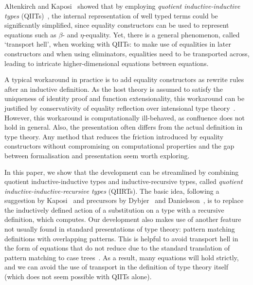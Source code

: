 \documentclass[a4paper,UKenglish,numberwithinsect,cleveref,thm-restate]{lipics-v2021}
\begin{document}
Altenkirch and Kaposi~\cite{Altenkirch2016a} showed that by employing \emph{quotient inductive-inductive types} (QIITs)~\cite{Altenkirch2018}, the internal representation of well typed terms could be significantly simplified, since equality constructors can be used to represent equations such as $\beta$- and $\eta$-equality.
%
Yet, there is a general phenomenon, called `transport hell', when working with QIITs: to make use of equalities in later constructors and when using eliminators, equalities need to be transported across,
leading to intricate higher-dimensional equations between equations.

A typical workaround in practice \cite{Kaposi2019,Kaposi2024a} is to add equality constructors as rewrite rules~\cite{Cockx2021,Cockx2020} after an inductive definition.
%
As the host theory is assumed to satisfy the uniqueness of identity proof and function extensionality, this workaround can be justified by conservativity of equality reflection over intensional type theory~\cite{Hofmann1996,Winterhalter2019,Kapulkin2025}.
%
However, this workaround is computationally ill-behaved, as confluence does not hold in general.
Also, the presentation often differs from the actual definition in type theory.
%
Any method that reduces the friction introduced by equality constructors without compromising on computational properties and the gap between formalisation and presentation seem worth exploring.
%

In this paper, we show that the development can be streamlined by combining quotient inductive-inductive types and inductive-recursive types, called \emph{quotient inductive-inductive-recursive types} (QIIRTs).
%
The basic idea, following a suggestion by Kaposi~\cite{Kaposi2023} and precursors by Dybjer~\cite{Dybjer1996} and Danielsson~\cite{Danielsson2006}, is to replace the inductively defined action of a substitution on a type with a recursive definition, which computes.
%
Our development also makes use of another feature not usually found in standard presentations of type theory: pattern matching definitions with overlapping patterns.
%
This is helpful to avoid transport hell in the form of equations that do not reduce due to the standard translation of pattern matching to case trees~\cite{Cockx2017}.
%
As a result, many equations will hold strictly, and we can avoid the use of transport in the definition of type theory itself (which does not seem possible with QIITs alone).
%
\end{document}
